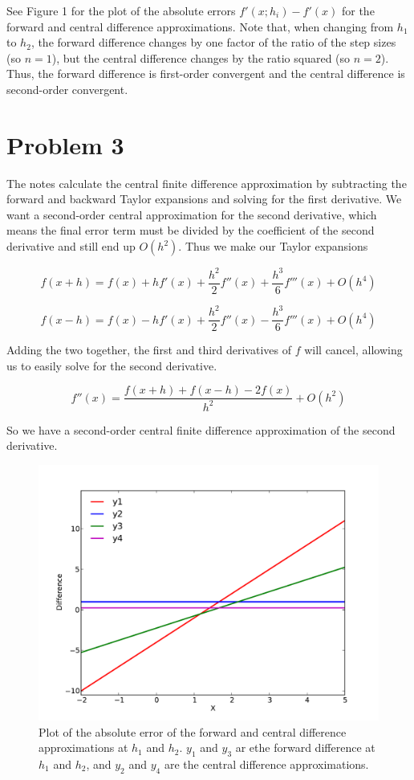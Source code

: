 \documentclass[11pt,letterpaper]{article}
\begin{document}
See Figure 1 for the plot of the absolute errors $f'(x;h_i) - f'(x)$ for the forward and central difference approximations. Note that, when changing from $h_1$ to $h_2$, the forward difference changes by one factor of the ratio of the step sizes (so $n=1$), but the central difference changes by the ratio squared (so $n=2$). Thus, the forward difference is first-order convergent and the central difference is second-order convergent.

\section*{Problem 3}

The notes calculate the central finite difference approximation by subtracting the forward and backward Taylor expansions and solving for the first derivative. We want a second-order central approximation for the second derivative, which means the final error term must be divided by the coefficient of the second derivative and still end up $O(h^2)$. Thus we make our Taylor expansions

$$ f(x+h) = f(x) + h f'(x) + \frac{h^2}{2}f''(x) + \frac{h^3}{6}f'''(x) + O(h^4) $$

$$ f(x-h) = f(x) - h f'(x) + \frac{h^2}{2}f''(x) - \frac{h^3}{6}f'''(x) + O(h^4) $$

Adding the two together, the first and third derivatives of $f$ will cancel, allowing us to easily solve for the second derivative.

$$ f''(x) = \frac{f(x+h) + f(x-h) - 2f(x)}{h^2} + O(h^2) $$

So we have a second-order central finite difference approximation of the second derivative.

\begin{figure}[!htb]\centering
  \includegraphics[width=1\textwidth]{FinDifApprox}
  \caption{Plot of the absolute error of the forward and central difference approximations at $h_1$ and $h_2$. $y_1$ and $y_3$ ar ethe forward difference at $h_1$ and $h_2$, and $y_2$ and $y_4$ are the central difference approximations.}
  \end{figure}
\end{document}
